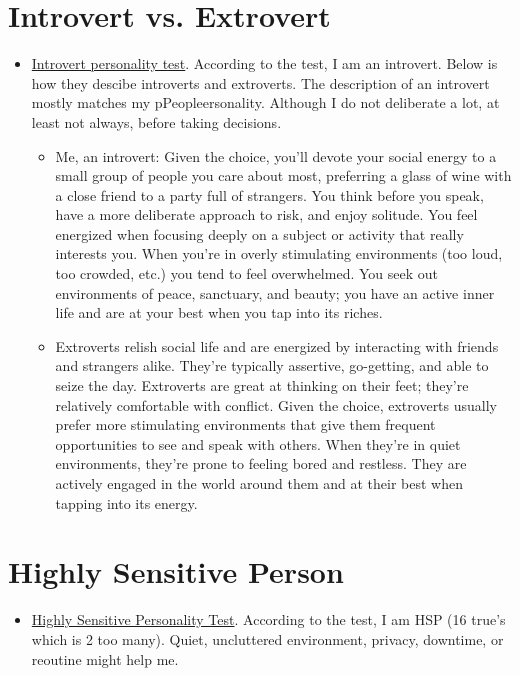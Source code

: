 \documentclass[12pt]{article}
\begin{document}
\section{Introvert vs. Extrovert}
\begin{itemize}
	\item \href{https://www.quietrev.com/the-introvert-test/}{Introvert personality test}. According to the test, I am an introvert. Below is how they descibe introverts and extroverts. The description of an introvert mostly matches my pPeopleersonality. Although I do not deliberate a lot, at least not always, before taking decisions.
	\begin{itemize}
		\item Me, an introvert: Given the choice, you’ll devote your social energy to a small group of people you care about most, preferring a glass of wine with a close friend to a party full of strangers. You think before you speak, have a more deliberate approach to risk, and enjoy solitude. You feel energized when focusing deeply on a subject or activity that really interests you. When you’re in overly stimulating environments (too loud, too crowded, etc.) you tend to feel overwhelmed. You seek out environments of peace, sanctuary, and beauty; you have an active inner life and are at your best when you tap into its riches.
		\item Extroverts relish social life and are energized by interacting with friends and strangers alike. They’re typically assertive, go-getting, and able to seize the day. Extroverts are great at thinking on their feet; they’re relatively comfortable with conflict. Given the choice, extroverts usually prefer more stimulating environments that give them frequent opportunities to see and speak with others. When they’re in quiet environments, they’re prone to feeling bored and restless. They are actively engaged in the world around them and at their best when tapping into its energy.
	\end{itemize}
\end{itemize}

\section{Highly Sensitive Person}
\begin{itemize}
	\item \href{https://hsperson.com/test/highly-sensitive-test/}{Highly Sensitive Personality Test}. According to the test, I am HSP (16 true's which is 2 too many). Quiet, uncluttered environment, privacy, downtime, or reoutine might help me.
\end{itemize}
\end{document}
